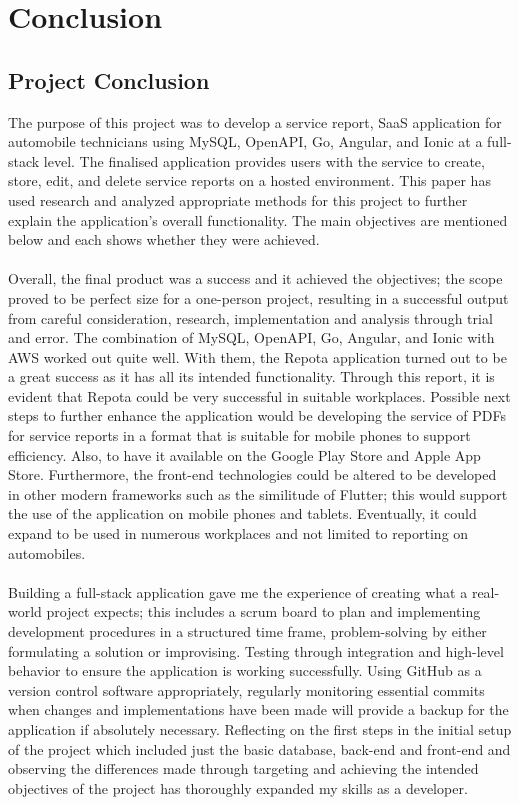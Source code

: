 \chapter{Conclusion}

\section{Project Conclusion}
The purpose of this project was to develop a service report, SaaS application for automobile technicians using MySQL, OpenAPI, Go, Angular, and Ionic at a full-stack level. The finalised application provides users with the service to create, store, edit, and delete service reports on a hosted environment. This paper has used research and analyzed appropriate methods for this project to further explain the application's overall functionality. The main objectives are mentioned below and each shows whether they were achieved.
\\\\ Overall, the final product was a success and it achieved the objectives; the scope proved to be perfect size for a one-person project, resulting in a successful output from careful consideration, research, implementation and analysis through trial and error. The combination of MySQL, OpenAPI, Go, Angular, and Ionic with AWS worked out quite well. With them, the Repota application turned out to be a great success as it has all its intended functionality. Through this report, it is evident that Repota could be very successful in suitable workplaces. Possible next steps to further enhance the application would be developing the service of PDFs for service reports in a format that is suitable for mobile phones to support efficiency. Also, to have it available on the Google Play Store and Apple App Store. Furthermore, the front-end technologies could be altered to be developed in other modern frameworks such as the similitude of Flutter; this would support the use of the application on mobile phones and tablets. Eventually, it could expand to be used in numerous workplaces and not limited to reporting on automobiles.
\\\\ Building a full-stack application gave me the experience of creating what a real-world project expects; this includes a scrum board to plan and implementing development procedures in a structured time frame, problem-solving by either formulating a solution or improvising. Testing through integration and high-level behavior to ensure the application is working successfully. Using GitHub as a version control software appropriately, regularly monitoring essential commits when changes and implementations have been made will provide a backup for the application if absolutely necessary. Reflecting on the first steps in the initial setup of the project which included just the basic database, back-end and front-end and observing the differences made through targeting and achieving the intended objectives of the project has thoroughly expanded my skills as a developer. 

